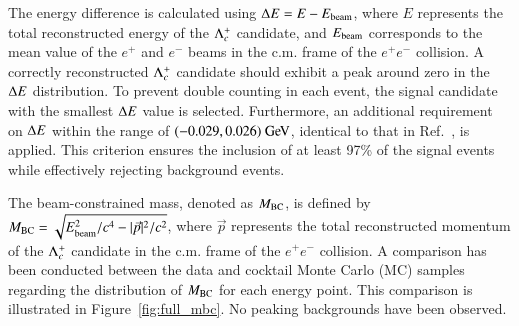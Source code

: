 The energy difference is calculated using $\Delta E=E-E_{\rm{beam}}$, where $E$ represents the total reconstructed energy of the $\Lambda_{c}^{+}$ candidate, and $E_{\rm{beam}}$ corresponds to the mean value of the $e^+$ and $e^-$ beams in the c.m. frame of the $e^+e^-$ collision. A correctly reconstructed $\Lambda_{c}^{+}$ candidate should exhibit a peak around zero in the $\Delta E$ distribution. To prevent double counting in each event, the signal candidate with the smallest $\Delta E$ value is selected. Furthermore, an additional requirement on $\Delta E$ within the range of $(-0.029, 0.026)\gev$, identical to that in Ref.~\cite{BESIII:2022xne}, is applied. This criterion ensures the inclusion of at least 97\% of the signal events while effectively rejecting background events.

The beam-constrained mass, denoted as $M_{\rm{BC}}$, is defined by $M_{\rm{BC}} = \sqrt{E_{\rm{beam}}^2/c^4 - |\vec{p}|^2/c^2}$, where $\vec{p}$ represents the total reconstructed momentum of the $\Lambda_{c}^{+}$ candidate in the c.m. frame of the $e^+e^-$ collision. A comparison has been conducted between the data and cocktail Monte Carlo (MC) samples regarding the distribution of $M_{\rm{BC}}$ for each energy point. This comparison is illustrated in Figure~\ref{fig:full_mbc}. No peaking backgrounds have been observed.


